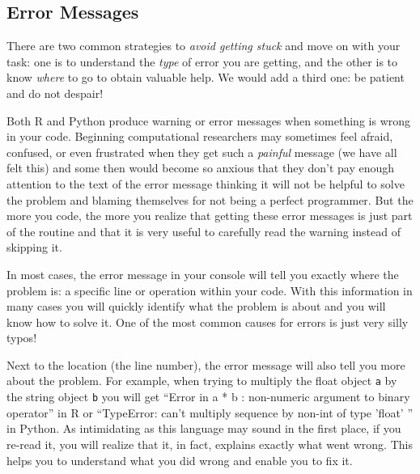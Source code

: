 \subsection{Error Messages}\label{sec:errormessages}


There are two common strategies to \textit{avoid getting stuck} and move on with your task: one is to understand the \textit{type} of error you are getting, and the other is to know \textit{where} to go to obtain valuable help. We would add a third one: be patient and do not despair!

Both R and Python produce warning or error messages when something is wrong in your code. Beginning computational researchers may sometimes feel afraid, confused, or even frustrated when they get such a \textit{painful} message (we have all felt this) and some then would become so anxious that they don't pay enough attention to the text of the error message thinking it will not be helpful to solve the problem and blaming themselves for not being a perfect programmer. But the more you code, the more you realize that getting these error messages is just part of the routine and that it is very useful to carefully read the warning instead of skipping it.

In most cases, the error message in your console will tell you exactly where the problem is: a specific line or operation within your code. With this information in many cases you will quickly identify what the problem is about and you will know how to solve it. One of the most common causes for  errors is just very silly typos!

Next to the location (the line number), the error message will also tell you more about the problem. For example, when trying to multiply the float object \texttt{a} by the string object \texttt{b} you will get ``Error in a * b : non-numeric argument to binary operator'' in R or ``TypeError: can't multiply sequence by non-int of type 'float' '' in Python. As intimidating as this language may sound in the first place, if you re-read it, you will realize that it, in fact, explains exactly what went wrong. This helps you to understand what you did wrong and enable you to fix it.


